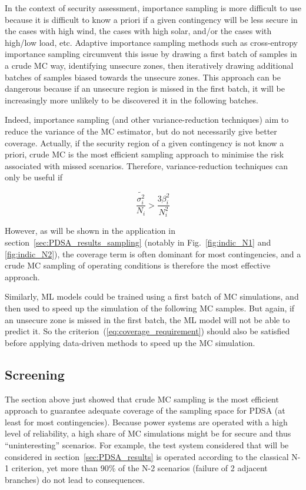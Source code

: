 In the context of security assessment, importance sampling is more difficult to use because it is difficult to know a priori if a given contingency will be less secure in the cases with high wind, the cases with high solar, and/or the cases with high/low load, etc. Adaptive importance sampling methods such as cross-entropy importance sampling circumvent this issue by drawing a first batch of samples in a crude MC way, identifying unsecure zones, then iteratively drawing additional batches of samples biased towards the unsecure zones. This approach can be dangerous because if an unsecure region is missed in the first batch, it will be increasingly more unlikely to be discovered it in the following batches.

Indeed, importance sampling (and other variance-reduction techniques) aim to reduce the variance of the MC estimator, but do not necessarily give better coverage. Actually, if the security region of a given contingency is not know a priori, crude MC is the most efficient sampling approach to minimise the risk associated with missed scenarios. Therefore, variance-reduction techniques can only be useful if

\begin{equation}
  \label{eq:coverage_requirement}
  \frac{\tilde{\sigma_i^2}}{N_i} > \frac{3 \beta_i^2}{N_i^2}
\end{equation}

However, as will be shown in the application in section~\ref{sec:PDSA_results_sampling} (notably in Fig.~\ref{fig:indic_N1} and \ref{fig:indic_N2}), the coverage term is often dominant for most contingencies, and a crude MC sampling of operating conditions is therefore the most effective approach.

Similarly, ML models could be trained using a first batch of MC simulations, and then used to speed up the simulation of the following MC samples. But again, if an unsecure zone is missed in the first batch, the ML model will not be able to predict it. So the criterion~(\ref{eq:coverage_requirement}) should also be satisfied before applying data-driven methods to speed up the MC simulation.



\subsection{Screening}
\label{sec:screening}

The section above just showed that crude MC sampling is the most efficient approach to guarantee adequate coverage of the sampling space for PDSA (at least for most contingencies). Because power systems are operated with a high level of reliability, a high share of MC simulations might be for secure and thus ``uninteresting'' scenarios. For example, the test system considered that will be considered in section~\ref{sec:PDSA_results} is operated according to the classical N-1 criterion, yet more than 90\% of the N-2 scenarios (failure of 2 adjacent branches) do not lead to consequences.

